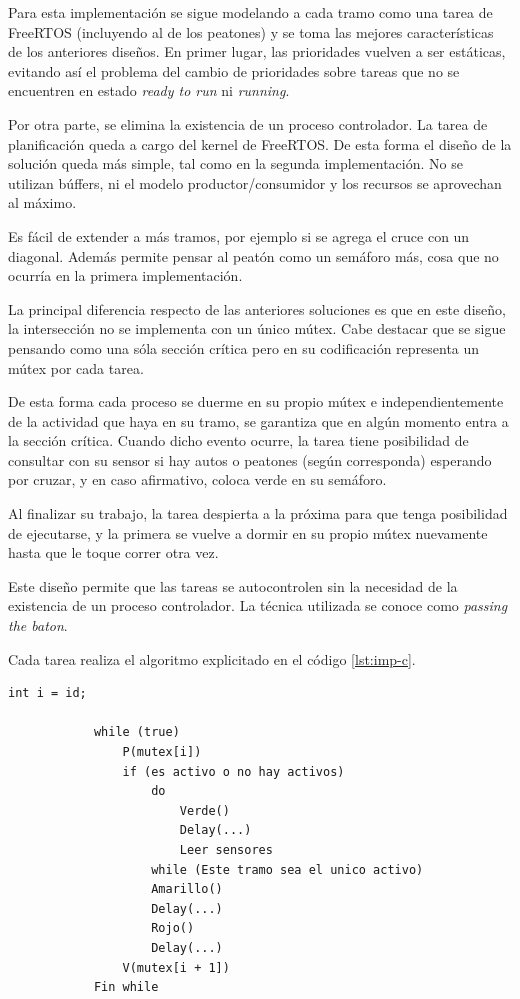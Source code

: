 		Para esta implementación se sigue modelando a cada tramo como una tarea de FreeRTOS (incluyendo al de los peatones) y se toma las mejores características de los anteriores diseños.
		En primer lugar, las prioridades vuelven a ser estáticas, evitando así el problema del cambio de prioridades sobre tareas que no se encuentren en estado \emph{ready to run} ni \emph{running}.

		Por otra parte, se elimina la existencia de un proceso controlador.
		La tarea de planificación queda a cargo del kernel de FreeRTOS.
		De esta forma el diseño de la solución queda más simple, tal como en la segunda implementación.
		No se utilizan búffers, ni el modelo productor/consumidor y los recursos se aprovechan al máximo.

		Es fácil de extender a más tramos, por ejemplo si se agrega el cruce con un diagonal.
		Además permite pensar al peatón como un semáforo más, cosa que no ocurría en la primera implementación.

		La principal diferencia respecto de las anteriores soluciones es que en este diseño, la intersección no se implementa con un único mútex.
		Cabe destacar que se sigue pensando como una sóla sección crítica pero en su codificación representa un mútex por cada tarea.

		De esta forma cada proceso se duerme en su propio mútex e independientemente de la actividad que haya en su tramo, se garantiza que en algún momento entra a la sección crítica.
		Cuando dicho evento ocurre, la tarea tiene posibilidad de consultar con su sensor si hay autos o peatones (según corresponda) esperando por cruzar, y en caso afirmativo, coloca verde en su semáforo.

		Al finalizar su trabajo, la tarea despierta a la próxima para que tenga posibilidad de ejecutarse, y la primera se vuelve a dormir en su propio mútex nuevamente hasta que le toque correr otra vez.

		Este diseño permite que las tareas se autocontrolen sin la necesidad de la existencia de un proceso controlador.
		La técnica utilizada se conoce como \emph{passing the baton}.

		Cada tarea realiza el algoritmo explicitado en el código \ref{lst:imp-c}.

		\begin{lstlisting}[float, label=lst:imp-c, caption=Pseudocódigo del programa que corre cada tarea en la implementación C.]
			int i = id;

			while (true)
				P(mutex[i])
				if (es activo o no hay activos)
					do
						Verde()
						Delay(...)
						Leer sensores
					while (Este tramo sea el unico activo)
					Amarillo()
					Delay(...)
					Rojo()
					Delay(...)
				V(mutex[i + 1])
			Fin while
		\end{lstlisting}

